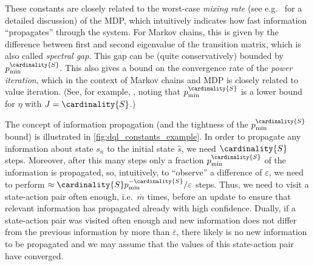 \documentclass{article}
\newcommand{\States}{S}
\newcommand{\initialstate}{\hat{s}}
\newcommand{\updatestep}{{\overline{\varepsilon}}}
\newcommand{\delay}{{\overline{m}}}
\begin{document}
These constants are closely related to the worst-case \emph{mixing rate} (see e.g.\ \cite[Chapter~5]{levin2017markov} for a detailed discussion) of the MDP, which intuitively indicates how fast information \enquote{propagates} through the system.
For Markov chains, this is given by the difference between first and second eigenvalue of the transition matrix, which is also called \emph{spectral gap}.
This gap can be (quite conservatively) bounded by $p_{\min}^{\cardinality{\States}}$.
This also gives a bound on the convergence rate of the \emph{power iteration}, which in the context of Markov chains and MDP is closely related to value iteration.
(See, for example, \cite[Theorem~8.5.2]{DBLP:books/wi/Puterman94}, noting that $p_{\min}^{\cardinality{\States}}$ is a lower bound for $\eta$ with $J = \cardinality{\States}$.)

The concept of information propagation (and the tightness of the $p_{\min}^{\cardinality{\States}}$ bound) is illustrated in \cref{fig:dql_constants_example}.
In order to propagate any information about state $s_n$ to the initial state $\initialstate$, we need $\cardinality{\States}$ steps.
Moreover, after this many steps only a fraction $p_{\min}^{\cardinality{\States}}$ of the information is propagated, so, intuitively, to \enquote{observe} a difference of $\varepsilon$, we need to perform $\approx \cardinality{\States}p_{\min}^{-\cardinality{\States}} / \varepsilon$ steps.
Thus, we need to visit a state-action pair often enough, i.e.\ $\delay$ times, before an update to ensure that relevant information has propagated already with high confidence.
Dually, if a state-action pair was visited often enough and new information does not differ from the previous information by more than $\updatestep$, there likely is no new information to be propagated and we may assume that the values of this state-action pair have converged.
\end{document}
